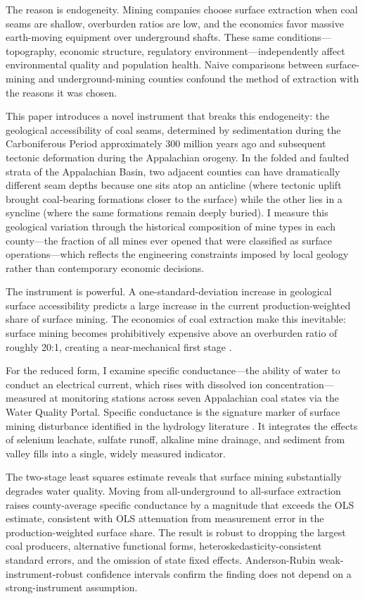 \documentclass[12pt]{article}
\begin{document}
The reason is endogeneity. Mining companies choose surface extraction when coal seams are shallow, overburden ratios are low, and the economics favor massive earth-moving equipment over underground shafts. These same conditions---topography, economic structure, regulatory environment---independently affect environmental quality and population health. Naive comparisons between surface-mining and underground-mining counties confound the method of extraction with the reasons it was chosen.

This paper introduces a novel instrument that breaks this endogeneity: the geological accessibility of coal seams, determined by sedimentation during the Carboniferous Period approximately 300 million years ago and subsequent tectonic deformation during the Appalachian orogeny. In the folded and faulted strata of the Appalachian Basin, two adjacent counties can have dramatically different seam depths because one sits atop an anticline (where tectonic uplift brought coal-bearing formations closer to the surface) while the other lies in a syncline (where the same formations remain deeply buried). I measure this geological variation through the historical composition of mine types in each county---the fraction of all mines ever opened that were classified as surface operations---which reflects the engineering constraints imposed by local geology rather than contemporary economic decisions.

The instrument is powerful. A one-standard-deviation increase in geological surface accessibility predicts a large increase in the current production-weighted share of surface mining. The economics of coal extraction make this inevitable: surface mining becomes prohibitively expensive above an overburden ratio of roughly 20:1, creating a near-mechanical first stage \citep{carlson2006statistical, peng2006longwall}.

For the reduced form, I examine specific conductance---the ability of water to conduct an electrical current, which rises with dissolved ion concentration---measured at monitoring stations across seven Appalachian coal states via the Water Quality Portal. Specific conductance is the signature marker of surface mining disturbance identified in the hydrology literature \citep{pond2010patterns, bernhardt2012synthetic, griffith2012effects}. It integrates the effects of selenium leachate, sulfate runoff, alkaline mine drainage, and sediment from valley fills into a single, widely measured indicator.

The two-stage least squares estimate reveals that surface mining substantially degrades water quality. Moving from all-underground to all-surface extraction raises county-average specific conductance by a magnitude that exceeds the OLS estimate, consistent with OLS attenuation from measurement error in the production-weighted surface share. The result is robust to dropping the largest coal producers, alternative functional forms, heteroskedasticity-consistent standard errors, and the omission of state fixed effects. Anderson-Rubin weak-instrument-robust confidence intervals confirm the finding does not depend on a strong-instrument assumption.
\end{document}
